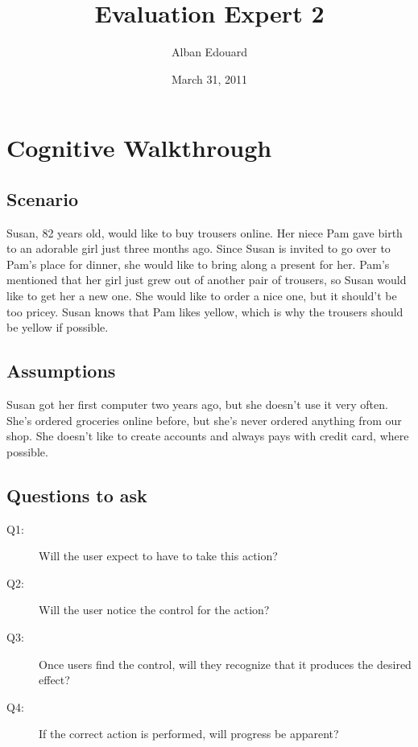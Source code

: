 \documentclass[fontsize=12pt,paper=a4]{scrartcl}
\begin{document}
\title{Evaluation Expert 2}
\date{March 31, 2011}
\author{Alban Edouard}
\maketitle

\section{Cognitive Walkthrough}

\subsection{Scenario}
Susan, 82 years old, would like to buy trousers online. Her niece Pam gave birth to an adorable girl just three months ago. Since Susan is invited to go over to Pam's place for dinner, she would like to bring along a present for her. Pam's mentioned that her girl just grew out of another pair of trousers, so Susan would like to get her a new one. She would like to order a nice one, but it should't be too pricey. Susan knows that Pam likes yellow, which is why the trousers should be yellow if possible. 

\subsection{Assumptions}
Susan got her first computer two years ago, but she doesn't use it very often. She's ordered groceries online before, but she's never ordered anything from our shop.
She doesn't like to create accounts and always pays with credit card, where possible.

\subsection{Questions to ask}
\begin{description}
\item[Q1:] Will the user expect to have to take this action?
\item[Q2:] Will the user notice the control for the action?
\item[Q3:] Once users find the control, will they recognize that it produces the desired effect?
\item[Q4:] If the correct action is performed, will progress be apparent?
\end{description}
 
\end{document}
